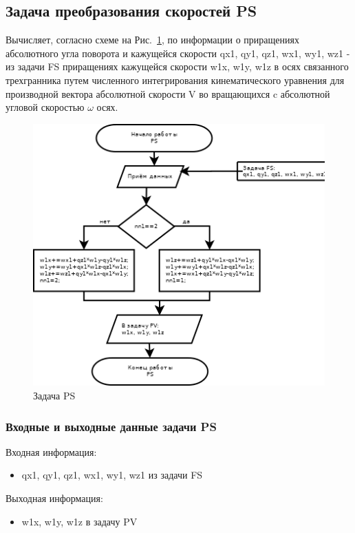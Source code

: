 \subsection{Задача преобразования скоростей PS}
Вычисляет, согласно схеме на Рис.~\ref{fig:PS}, по  информации о приращениях  абсолютного угла поворота и кажущейся скорости  qx1, qy1, qz1, wx1, wy1, wz1 - 
из задачи  FS  приращениях   кажущейся скорости  w1x, w1y, w1z  
в осях связанного трехгранника путем численного интегрирования кинематического уравнения для  производной вектора абсолютной скорости V  
во вращающихся c абсолютной  угловой скоростью $\omega$  осях.
\begin{figure}[H]
    \centering
    \includegraphics[width=0.5\linewidth]{images/PS.png}
    \caption{Задача PS}
    \label{fig:PS}
\end{figure}
\subsubsection{Входные и выходные данные задачи PS}
Входная информация:
\begin{itemize}
\item qx1, qy1, qz1, wx1, wy1, wz1 из задачи  FS
\end{itemize}
Выходная информация:
\begin{itemize}
    \item w1x, w1y, w1z в задачу PV
\end{itemize}
